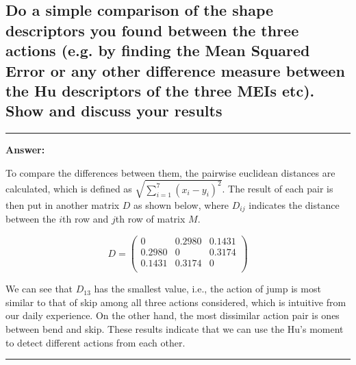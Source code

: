 \documentclass[conference]{styles/acmsiggraph}
\newenvironment{answer}{}{}
\begin{document}
\subsection{Do a simple comparison of the shape descriptors you found between the three actions (e.g. by
finding the Mean Squared Error or any other difference measure between the Hu descriptors of the
three MEIs etc). Show and discuss your results}
\begin{answer}
	\rule{\textwidth}{0.4pt}
	\textbf{Answer:}
	
 To compare the differences between them, the pairwise euclidean distances are calculated, which is defined as $\sqrt{\sum_{i=1}^{7}(x_i - y_i)^2}$. The result of each pair is then put in another matrix $D$ as shown below, where $D_{ij}$ indicates the distance between the $i$th row and $j$th row of matrix $M$. 


	$$D = \begin{pmatrix}
		0   & 0.2980 &   0.1431\\
    0.2980     &    0  &  0.3174\\
    0.1431  &  0.3174     &    0\\
	\end{pmatrix}$$

	We can see that $D_{13}$ has the smallest value, i.e., the action of jump is most similar to that of skip among all three actions considered, which is intuitive from our daily experience. On the other hand, the most dissimilar action pair is ones between bend and skip. These results indicate that we can use the Hu's moment to detect different actions from each other.

	\rule{\textwidth}{0.4pt}

\end{answer}

			
\end{document}
